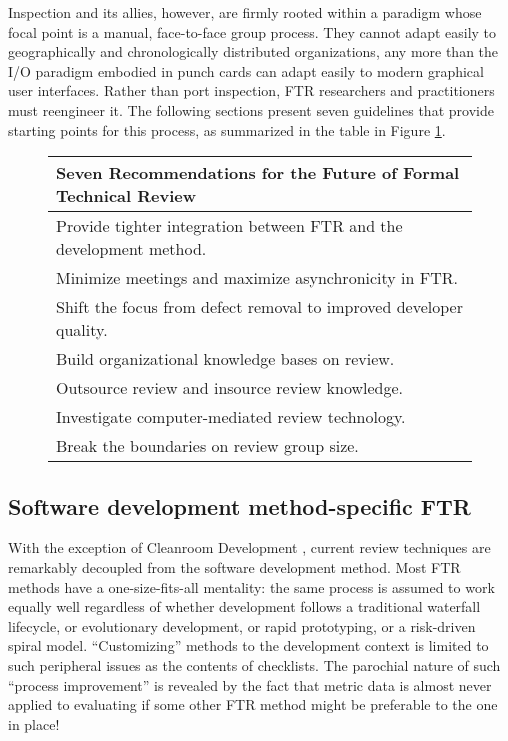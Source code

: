 Inspection and its allies, however, are firmly rooted within a paradigm
whose focal point is a manual, face-to-face group process.  They cannot
adapt easily to geographically and chronologically distributed
organizations, any more than the I/O paradigm embodied in punch cards can
adapt easily to modern graphical user interfaces.  Rather than port
inspection, FTR researchers and practitioners must reengineer it.  The
following sections present seven guidelines that provide starting points
for this process, as summarized in the table in Figure \ref{fig:recs}.

\begin{figure}[t]
\begin{center}
\begin{tabular} {|l|} \hline   
\bf{Seven Recommendations for the Future of Formal Technical Review} \\ \hline
Provide tighter integration between FTR and the development method. \\ \hline
Minimize meetings and maximize asynchronicity in FTR. \\ \hline
Shift the focus from defect removal to improved developer quality. \\ \hline 
Build organizational knowledge bases on review. \\ \hline
Outsource review and insource review knowledge. \\ \hline
Investigate computer-mediated review technology.  \\ \hline
Break the boundaries on review group size. \\ \hline
\end{tabular}
\end{center}
\label{fig:recs}
\end{figure}

\subsection*{Software development method-specific FTR}

With the exception of Cleanroom Development \cite{Dyer92}, current review techniques are
remarkably decoupled from the software development method.  Most FTR
methods have a one-size-fits-all mentality: the same process is assumed to
work equally well regardless of whether development follows a traditional
waterfall lifecycle, or evolutionary development, or rapid prototyping, or
a risk-driven spiral model.  ``Customizing'' methods to the development
context is limited to such peripheral issues as the contents of checklists.
The parochial nature of such ``process improvement'' is revealed by the
fact that metric data is almost never applied to evaluating if some other
FTR method might be preferable to the one in place!

